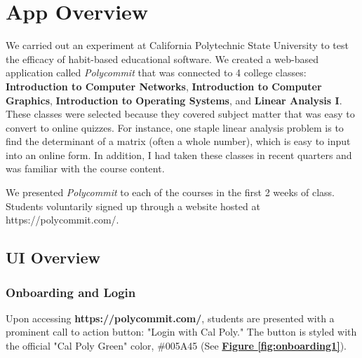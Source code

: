\chapter{App Overview}

\par We carried out an experiment at California Polytechnic State University to test the efficacy of habit-based educational software. We created a web-based application called \textit{Polycommit} that was connected to 4 college classes: \textbf{Introduction to Computer Networks}, \textbf{Introduction to Computer Graphics}, \textbf{Introduction to Operating Systems}, and \textbf{Linear Analysis I}. These classes were selected because they covered subject matter that was easy to convert to online quizzes. For instance, one staple linear analysis problem is to find the determinant of a matrix (often a whole number), which is easy to input into an online form. In addition, I had taken these classes in recent quarters and was familiar with the course content.

\par We presented \textit{Polycommit} to each of the courses in the first 2 weeks of class. Students voluntarily signed up through a website hosted at https://polycommit.com/.

\section{UI Overview}

\subsection{Onboarding and Login}
\par Upon accessing \textbf{https://polycommit.com/}, students are presented with a prominent call to action button: "Login with Cal Poly." The button is styled with the official "Cal Poly Green" color, \textcolor{CPGreen}{\#005A45} (See \textbf{\hyperref[fig:onboarding1]{Figure \ref*{fig:onboarding1}}}).


